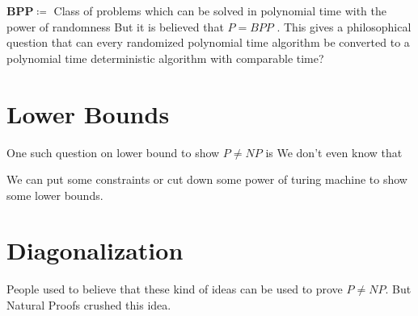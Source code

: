 \documentclass{article}
\begin{document}
$\boldsymbol{BP P \coloneqq}$ Class of problems which can be solved in polynomial time with the power of randomness
But it is believed that $P = BP P$ . This gives a philosophical question that can every randomized polynomial time algorithm be converted to a polynomial time deterministic algorithm with comparable time?
\section{Lower Bounds}
One such question on lower bound to show $P\neq NP$ is
We don’t even know that

We can put some constraints or cut down some power of turing machine to show some lower bounds. 
\section{Diagonalization}
People used to believe that these kind of ideas can be used to prove $P \neq  N P$. But Natural Proofs \cite{natproof} crushed this idea.


\pagebreak



\end{document}

